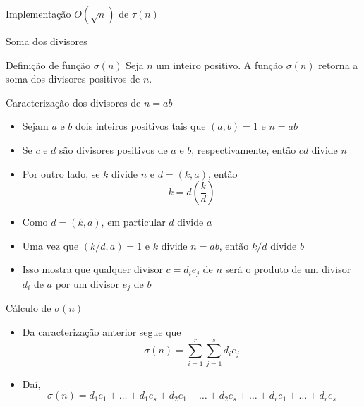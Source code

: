\begin{frame}[fragile]{Implementação $O(\sqrt{n})$ de $\tau(n)$}
\end{frame}

\begin{frame}[fragile]{Soma dos divisores}
    \begin{block}{Definição de função $\sigma(n)$}
        Seja $n$ um inteiro positivo. A função $\sigma(n)$ retorna a soma dos divisores positivos 
        de $n$.
    \end{block}
\end{frame}

\begin{frame}[fragile]{Caracterização dos divisores de $n = ab$}
    \begin{itemize}
        \item Sejam $a$ e $b$ dois inteiros positivos tais que $(a, b) = 1$ e $n = ab$

        \item Se $c$ e $d$ são divisores positivos de $a$ e $b$, respectivamente, então $cd$ divide $n$

        \item  Por outro lado, se $k$ divide $n$ e $d = (k, a)$, então
$$
    k = d\left(\frac{k}{d}\right)
$$

        \item Como $d = (k, a)$, em particular $d$ divide $a$

        \item Uma vez que $(k/d, a) = 1$ e $k$ divide $n = ab$, então $k/d$ divide $b$

        \item Isso mostra que qualquer divisor $c = d_ie_j$ de $n$ será o produto de um divisor $d_i$ de $a$ por um divisor $e_j$ de $b$
    \end{itemize}

\end{frame}

\begin{frame}[fragile]{Cálculo de $\sigma(n)$}

    \begin{itemize}
        \item Da caracterização anterior segue que
$$
    \sigma(n) = \sum_{i = 1}^r \sum_{j = 1}^s d_ie_j
$$
        \item Daí,
$$
    \sigma(n) = d_1e_1 + \ldots + d_1e_s + d_2e_1 + \ldots + d_2e_s + \ldots + d_re_1 + \ldots + d_re_s
$$

    \end{itemize}

\end{frame}

